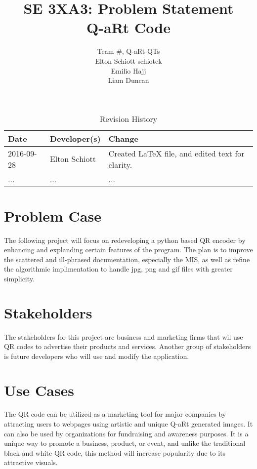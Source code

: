 \documentclass{article}
\title{SE 3XA3: Problem Statement\\Q-aRt Code}
\author{Team \#, Q-aRt QTs
		\\ Elton Schiott schiotek
		\\ Emilio Hajj
		\\ Liam Duncan
}
\date{}
\begin{document}
\begin{table}[hp]
\caption{Revision History} \label{TblRevisionHistory}
\begin{tabularx}{\textwidth}{llX}
\toprule
\textbf{Date} & \textbf{Developer(s)} & \textbf{Change}\\
\midrule
2016-09-28 & Elton Schiott & Created LaTeX file, and edited text for clarity.\\
... & ... & ...\\
\bottomrule
\end{tabularx}
\end{table}

\newpage

\maketitle

\section{Problem Case}
	
	\paragraph{}
	
		The following project will focus on redeveloping a python based QR 
		encoder by enhancing and explanding certain features of the program. 
		The plan is to improve the scattered and ill-phrased documentation, especially the MIS, as well as refine 
		the algorithmic implimentation to handle jpg, png and gif files with greater simplicity.
	
\section{Stakeholders}

	\paragraph{}
	
		The stakeholders for this project are business and marketing firms that 
		wil use QR codes to advertise their products and services. Another 
		group of stakeholders is future developers who will use and modify the 
		application.
	
\section{Use Cases}

	\paragraph{}
	
		The QR code can be utilized as a marketing tool for major companies by 
		attracting users to webpages using artistic and unique Q-aRt generated 
		images. It can also be used by organizations for fundraising and 
		awareness purposes. It is a unique way to promote a business, product, 
		or event, and unlike the traditional black and white QR code, this 
		method will increase popularity due to its attractive visuals.
\end{document}
